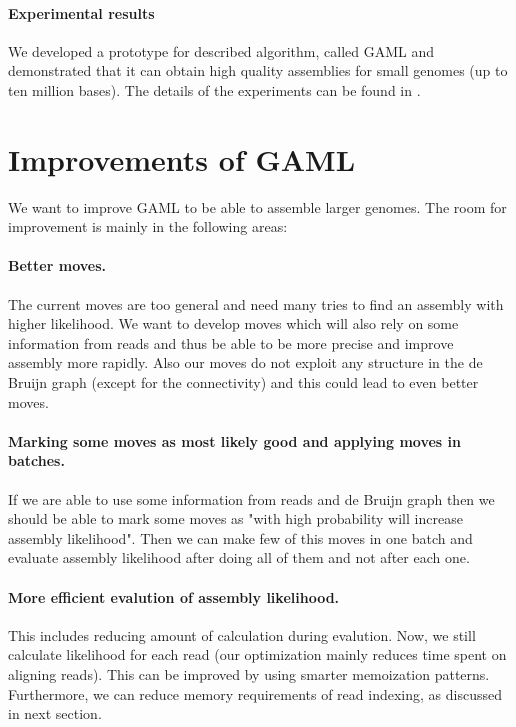 \paragraph{Experimental results}
We developed a prototype for described algorithm, called GAML and
demonstrated that it can obtain high quality assemblies
for small genomes (up to ten million bases). The details
of the experiments can be found in \citet{GAML}.

\section{Improvements of GAML}

We want to improve GAML to be able to assemble larger genomes.
The room for improvement is mainly in the following areas:

\paragraph{Better moves.}
The current moves are too general and need many tries to
find an assembly with higher likelihood. We want to develop
moves which will also rely on some information from reads
and thus be able to be more precise and improve
assembly more rapidly. Also our moves
do not exploit any structure in the de Bruijn graph (except for the connectivity)
and this could lead to even better moves.

\paragraph{Marking some moves as most likely good and applying moves in batches.}
If we are able to use some information from reads and de Bruijn graph
then we should be able to mark some moves as "with high probability will increase
assembly likelihood". Then we can make few of this moves in one
batch and evaluate assembly likelihood after doing all of them
and not after each one.

\paragraph{More efficient evalution of assembly likelihood.}
This includes reducing amount of calculation during evalution.
Now, we still calculate likelihood for each read (our optimization
mainly reduces time spent on aligning reads). This can
be improved by using smarter memoization patterns.
Furthermore, we can reduce memory requirements
of read indexing, as discussed in next section.

